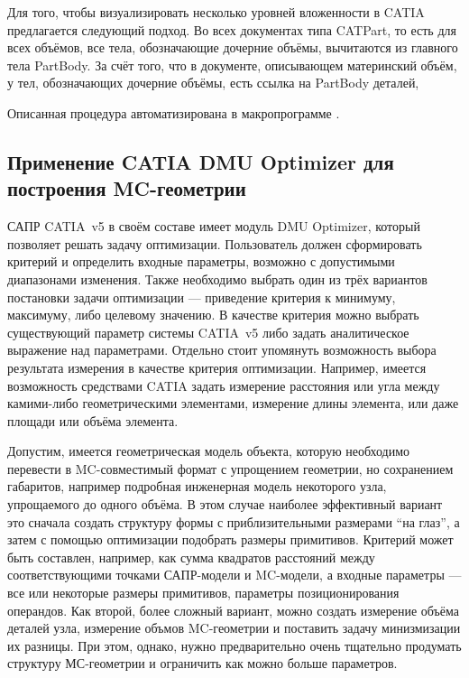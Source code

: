Для того, чтобы визуализировать несколько уровней вложенности в CATIA предлагается следующий подход. Во всех документах типа CATPart, то есть для всех объёмов, все тела, обозначающие дочерние объёмы, вычитаются из главного тела PartBody. За счёт того, что в документе, описывающем материнский объём, у тел, обозначающих дочерние объёмы, есть ссылка на PartBody деталей, 

Описанная процедура автоматизирована в макропрограмме .


\subsection{Применение CATIA DMU Optimizer для построения MC-геометрии}\label{sec:CATIAoptimize}

САПР CATIA~v5 в своём составе имеет модуль DMU Optimizer, который позволяет решать задачу оптимизации. Пользователь должен сформировать критерий и определить входные параметры, возможно с допустимыми диапазонами изменения. Также необходимо выбрать один из трёх вариантов постановки задачи оптимизации --- приведение критерия к минимуму, максимуму, либо целевому значению. В качестве критерия можно выбрать существующий параметр системы CATIA~v5 либо задать аналитическое выражение над параметрами. Отдельно стоит упомянуть возможность выбора результата измерения в качестве критерия оптимизации. Например, имеется возможность средствами CATIA задать измерение расстояния или угла между камими-либо геометрическими элементами, измерение длины элемента, или даже площади или объёма элемента.

Допустим, имеется геометрическая модель объекта, которую необходимо перевести в MC-совместимый формат с упрощением геометрии, но сохранением габаритов, например подробная инженерная модель некоторого узла, упрощаемого до одного объёма. В этом случае наиболее эффективный вариант это сначала создать структуру формы с приблизительными размерами ``на глаз'', а затем с помощью оптимизации подобрать размеры примитивов. Критерий может быть составлен, например, как сумма квадратов расстояний между соответствующими точками САПР-модели и MC-модели, а входные параметры --- все или некоторые размеры примитивов, параметры позиционирования операндов.
Как второй, более сложный вариант, можно создать измерение объёма деталей узла, измерение объмов MC-геометрии и поставить задачу минизмизации их разницы. При этом, однако, нужно предварительно очень тщательно продумать структуру МС-геометрии и ограничить как можно больше параметров.

